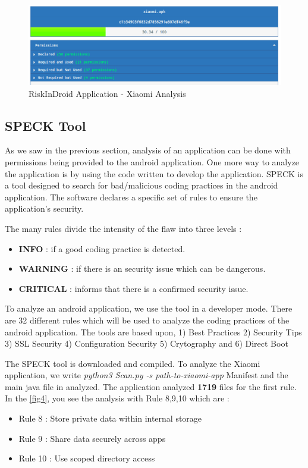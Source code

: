 \documentclass[runningheads]{llncs}
\begin{document}
\begin{figure}
    \includegraphics[width=\textwidth]{images/xiaomi-riskinDroid.png}
    \caption{RiskInDroid Application - Xiaomi Analysis} \label{fig3}
\end{figure}


\subsection{SPECK Tool}
As we saw in the previous section, analysis of an application can be done with permissions being provided to the 
android application. One more way to analyze the application is by using the code written to develop the application.
SPECK is a tool designed to search for bad/malicious coding practices in the android application. The software declares a specific set of 
rules to ensure the application's security. 

The many rules divide the intensity of the flaw into three levels : 
\begin{itemize}
    \item \textbf{INFO} : if a good coding practice is detected.
    \item \textbf{WARNING} : if there is an security issue which can be dangerous.
    \item \textbf{CRITICAL} : informs that there is a confirmed security issue.
\end{itemize}

To analyze an android  application, we use the tool in a developer mode. There are 32 different rules which will be used to analyze the coding practices of the android application.
The tools are based upon, 1) Best Practices 2) Security Tips 3) SSL Security 4) Configuration Security 5) Crytography and 6) Direct Boot

The SPECK tool is downloaded and compiled. To analyze the Xiaomi application, we write \textit{python3 Scan.py -s path-to-xiaomi-app}
Manifest and the main java file in analyzed. The application analyzed \textbf{1719} files for the first rule.
In the \ref{fig4}, you see the analysis with Rule 8,9,10 which are : 
\begin{itemize}
    \item Rule 8 : Store private data within internal storage
    \item Rule 9 : Share data securely across apps
    \item Rule 10 : Use scoped directory access
\end{itemize}
\end{document}
